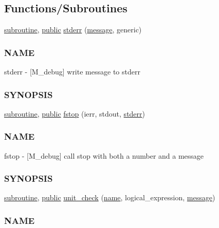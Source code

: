 \subsection*{Functions/\+Subroutines}
\begin{DoxyCompactItemize}
\item 
\hyperlink{M__stopwatch_83_8txt_acfbcff50169d691ff02d4a123ed70482}{subroutine}, \hyperlink{M__stopwatch_83_8txt_a2f74811300c361e53b430611a7d1769f}{public} \hyperlink{namespacem__debug_ad59ade4de861dcf4e007521b2cf2f304}{stderr} (\hyperlink{M__stopwatch_83_8txt_aa4313e9a55405841f95e6550cd87fc3b}{message}, generic)
\begin{DoxyCompactList}\small\item\em \subsubsection*{N\+A\+ME}

stderr -\/ \mbox{[}M\+\_\+debug\mbox{]} write message to stderr \subsubsection*{S\+Y\+N\+O\+P\+S\+IS}\end{DoxyCompactList}\item 
\hyperlink{M__stopwatch_83_8txt_acfbcff50169d691ff02d4a123ed70482}{subroutine}, \hyperlink{M__stopwatch_83_8txt_a2f74811300c361e53b430611a7d1769f}{public} \hyperlink{namespacem__debug_a66fa03a6a97837acc4c1265be1294295}{fstop} (ierr, stdout, \hyperlink{namespacem__debug_ad59ade4de861dcf4e007521b2cf2f304}{stderr})
\begin{DoxyCompactList}\small\item\em \subsubsection*{N\+A\+ME}

fstop -\/ \mbox{[}M\+\_\+debug\mbox{]} call stop with both a number and a message \subsubsection*{S\+Y\+N\+O\+P\+S\+IS}\end{DoxyCompactList}\item 
\hyperlink{M__stopwatch_83_8txt_acfbcff50169d691ff02d4a123ed70482}{subroutine}, \hyperlink{M__stopwatch_83_8txt_a2f74811300c361e53b430611a7d1769f}{public} \hyperlink{namespacem__debug_a0ae797092ab85a8ba9258dc9f8949189}{unit\+\_\+check} (\hyperlink{M__stopwatch_83_8txt_a3f508a893ae4c3b397b4383e33b9bcae}{name}, logical\+\_\+expression, \hyperlink{M__stopwatch_83_8txt_aa4313e9a55405841f95e6550cd87fc3b}{message})
\begin{DoxyCompactList}\small\item\em \subsubsection*{N\+A\+ME}


\end{DoxyCompactList}
\end{DoxyCompactItemize}
